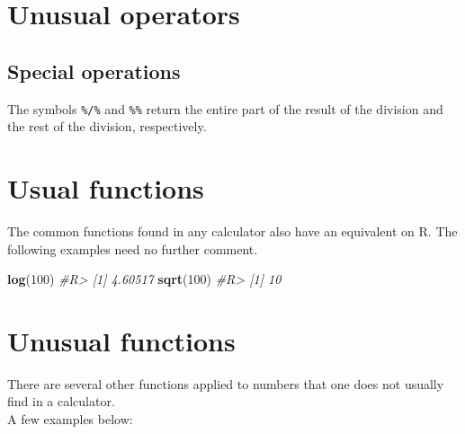 \documentclass[]{book}
\newenvironment{Shaded}{}{}
\newcommand{\CommentTok}[1]{\textcolor[rgb]{0.38,0.63,0.69}{\textit{#1}}}
\newcommand{\DecValTok}[1]{\textcolor[rgb]{0.25,0.63,0.44}{#1}}
\newcommand{\KeywordTok}[1]{\textcolor[rgb]{0.00,0.44,0.13}{\textbf{#1}}}
\newcommand{\NormalTok}[1]{#1}
\newcommand{\OperatorTok}[1]{\textcolor[rgb]{0.40,0.40,0.40}{#1}}
\theoremstyle{definition}
\theoremstyle{definition}
\theoremstyle{definition}
\theoremstyle{remark}
\begin{document}
\hypertarget{unusual-operators}{%
\section{Unusual operators}\label{unusual-operators}}

\hypertarget{special-operations}{%
\subsection{Special operations}\label{special-operations}}

The symbols \texttt{\%/\%} and \texttt{\%\%} return the entire part of
the result of the division and the rest of the division, respectively.

\begin{Shaded}
\end{Shaded}

\hypertarget{usual-functions}{%
\section{Usual functions}\label{usual-functions}}

The common functions found in any calculator also have an equivalent on
R. The following examples need no further comment.

\begin{Shaded}
\begin{Highlighting}[]
\KeywordTok{log}\NormalTok{(}\DecValTok{100}\NormalTok{)}
\CommentTok{#R> [1] 4.60517}
\KeywordTok{sqrt}\NormalTok{(}\DecValTok{100}\NormalTok{)}
\CommentTok{#R> [1] 10}
\end{Highlighting}
\end{Shaded}

\hypertarget{unusual-functions}{%
\section{Unusual functions}\label{unusual-functions}}

There are several other functions applied to numbers that one does not
usually find in a calculator.\\
A few examples below:
\end{document}
